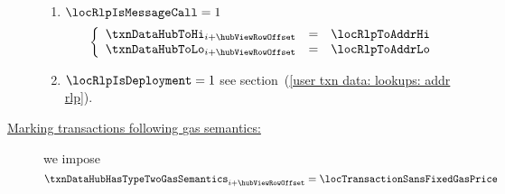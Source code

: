 \begin{description}
		\begin{enumerate}
			\item
				\If $\locRlpIsMessageCall = 1$ \Then
				\[
					\left\{ \begin{array}{lcl}
						\txnDataHubToHi _{i + \hubViewRowOffset} & = & \locRlpToAddrHi \\
						\txnDataHubToLo _{i + \hubViewRowOffset} & = & \locRlpToAddrLo \\
					\end{array} \right.
				\]
			\item
				\If $\locRlpIsDeployment = 1$ \Then see
				section~(\ref{user txn data: lookups: addr rlp}).
		\end{enumerate}
	\item[\underline{Marking transactions following \cite{EIP-1559} gas semantics:}]
		we impose
		\[
			\txnDataHubHasTypeTwoGasSemantics _{i + \hubViewRowOffset}
			=
			\locTransactionSansFixedGasPrice
		\]
\end{description}
